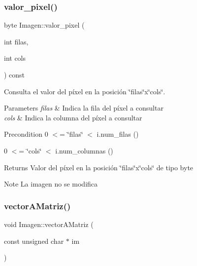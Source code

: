 \subsubsection{\texorpdfstring{valor\+\_\+pixel()}{valor\_pixel()}\hspace{0.1cm}{\footnotesize\ttfamily [2/2]}}
{\footnotesize\ttfamily byte Imagen\+::valor\+\_\+pixel (\begin{DoxyParamCaption}\item[{int}]{filas,  }\item[{int}]{cols }\end{DoxyParamCaption}) const}



Consulta el valor del píxel en la posición \char`\"{}filas\char`\"{}x\char`\"{}cols\char`\"{}. 


\begin{DoxyParams}{Parameters}
{\em filas} & Indica la fila del píxel a consultar \\
\hline
{\em cols} & Indica la columna del píxel a consultar \\
\hline
\end{DoxyParams}
\begin{DoxyPrecond}{Precondition}
0 $<$= \char`\"{}filas\char`\"{} $<$ i.\+num\+\_\+filas () 

0 $<$= \char`\"{}cols\char`\"{} $<$ i.\+num\+\_\+columnas () 
\end{DoxyPrecond}
\begin{DoxyReturn}{Returns}
Valor del píxel en la posición \char`\"{}filas\char`\"{}x\char`\"{}cols\char`\"{} de tipo byte 
\end{DoxyReturn}
\begin{DoxyNote}{Note}
La imagen no se modifica 
\end{DoxyNote}
\mbox{\label{classImagen_a9474788797224ae8011aa346acedc6c1}} 
\subsubsection{\texorpdfstring{vector\+A\+Matriz()}{vectorAMatriz()}}
{\footnotesize\ttfamily void Imagen\+::vector\+A\+Matriz (\begin{DoxyParamCaption}\item[{const unsigned char $\ast$}]{im }\end{DoxyParamCaption})}



